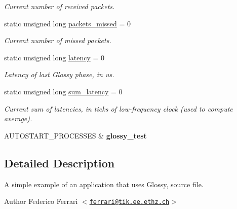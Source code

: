 \begin{DoxyCompactItemize}
\begin{DoxyCompactList}\small\item\em Current number of received packets. \end{DoxyCompactList}\item 
\hypertarget{group__glossy-test-variables-stats_ga1f7d22828e5e1c2a13c4dcd71a000420}{
static unsigned long \hyperlink{group__glossy-test-variables-stats_ga1f7d22828e5e1c2a13c4dcd71a000420}{packets\_\-missed} = 0}
\label{group__glossy-test-variables-stats_ga1f7d22828e5e1c2a13c4dcd71a000420}

\begin{DoxyCompactList}\small\item\em Current number of missed packets. \end{DoxyCompactList}\item 
\hypertarget{group__glossy-test-variables-stats_gaad9aca10bbb196083acdc1981d5502b5}{
static unsigned long \hyperlink{group__glossy-test-variables-stats_gaad9aca10bbb196083acdc1981d5502b5}{latency} = 0}
\label{group__glossy-test-variables-stats_gaad9aca10bbb196083acdc1981d5502b5}

\begin{DoxyCompactList}\small\item\em Latency of last Glossy phase, in us. \end{DoxyCompactList}\item 
\hypertarget{group__glossy-test-variables-stats_gac156624836ae9355d8f554bf0969254b}{
static unsigned long \hyperlink{group__glossy-test-variables-stats_gac156624836ae9355d8f554bf0969254b}{sum\_\-latency} = 0}
\label{group__glossy-test-variables-stats_gac156624836ae9355d8f554bf0969254b}

\begin{DoxyCompactList}\small\item\em Current sum of latencies, in ticks of low-\/frequency clock (used to compute average). \end{DoxyCompactList}\item 
\hypertarget{group__glossy-test-init_ga32cc397a384ec81c0310150a939756f7}{
AUTOSTART\_\-PROCESSES \& {\bfseries glossy\_\-test}}
\label{group__glossy-test-init_ga32cc397a384ec81c0310150a939756f7}

\end{DoxyCompactItemize}


\subsection{Detailed Description}
A simple example of an application that uses Glossy, source file.

\begin{DoxyAuthor}{Author}
Federico Ferrari $<$\href{mailto:ferrari@tik.ee.ethz.ch}{\tt ferrari@tik.ee.ethz.ch}$>$ 
\end{DoxyAuthor}
